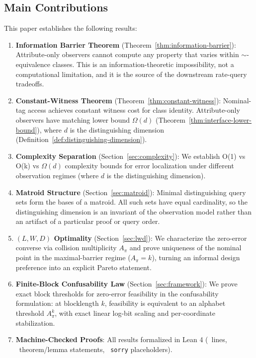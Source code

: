 \subsection{Main Contributions}

This paper establishes the following results:

\begin{enumerate}
\item \textbf{Information Barrier Theorem} (Theorem~\ref{thm:information-barrier}): Attribute-only observers cannot compute any property that varies within $\sim$-equivalence classes. This is an information-theoretic impossibility, not a computational limitation, and it is the source of the downstream rate-query tradeoffs.

\item \textbf{Constant-Witness Theorem} (Theorem~\ref{thm:constant-witness}): Nominal-tag access achieves constant witness cost for class identity. Attribute-only observers have matching lower bound $\Omega(d)$ (Theorem~\ref{thm:interface-lower-bound}), where $d$ is the distinguishing dimension (Definition~\ref{def:distinguishing-dimension}).

\item \textbf{Complexity Separation} (Section~\ref{sec:complexity}): We establish O(1) vs O(k) vs $\Omega(d)$ complexity bounds for error localization under different observation regimes (where $d$ is the distinguishing dimension).

\item \textbf{Matroid Structure} (Section~\ref{sec:matroid}): Minimal distinguishing query sets form the bases of a matroid. All such sets have equal cardinality, so the distinguishing dimension is an invariant of the observation model rather than an artifact of a particular proof or query order.

\item \textbf{$(L, W, D)$ Optimality} (Section~\ref{sec:lwd}): We characterize the zero-error converse via collision multiplicity $A_\pi$ and prove uniqueness of the nominal point in the maximal-barrier regime ($A_\pi=k$), turning an informal design preference into an explicit Pareto statement.

\item \textbf{Finite-Block Confusability Law} (Section~\ref{sec:framework}): We prove exact block thresholds for zero-error feasibility in the confusability formulation: at blocklength $k$, feasibility is equivalent to an alphabet threshold $A_\pi^k$, with exact linear log-bit scaling and per-coordinate stabilization.

\item \textbf{Machine-Checked Proofs}: All results formalized in Lean 4 (\LeanTotalLines\ lines, \LeanTotalTheorems\ theorem/lemma statements, \LeanTotalSorry\ \texttt{sorry} placeholders).
\end{enumerate}


